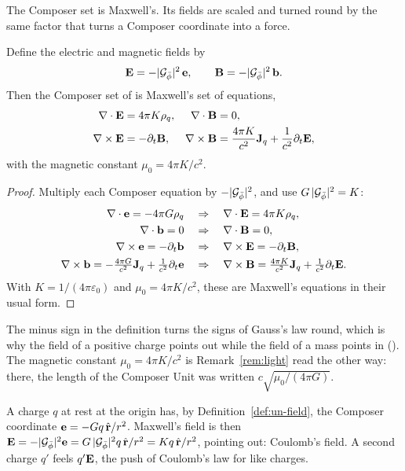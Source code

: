 The Composer set is Maxwell's. Its fields are scaled and turned round by the same factor that turns a Composer coordinate into a force.

\begin{theorem}\label{thm:un-maxwell}
Define the electric and magnetic fields by
\[
\mathbf{E} = -|\mathcal{G}_{\bar{\phi}}|^2\,\mathbf{e} , \qquad \mathbf{B} = -|\mathcal{G}_{\bar{\phi}}|^2\,\mathbf{b} .
\]
Then the Composer set of  is Maxwell's set of equations,
\begin{align*}
\nabla\cdot\mathbf{E} &= 4\pi K\rho_q , & \nabla\cdot\mathbf{B} &= 0 ,\\
\nabla\times\mathbf{E} &= -\partial_t\mathbf{B} , & \nabla\times\mathbf{B} &= \frac{4\pi K}{c^2}\mathbf{J}_q + \frac{1}{c^2}\partial_t\mathbf{E} ,
\end{align*}
with the magnetic constant $\mu_0 = 4\pi K/c^2$.
\end{theorem}

\begin{proof}
Multiply each Composer equation by $-|\mathcal{G}_{\bar{\phi}}|^2$, and use $G\,|\mathcal{G}_{\bar{\phi}}|^2 = K$:
\begin{align*}
\nabla\cdot\mathbf{e} = -4\pi G\rho_q \quad&\Rightarrow\quad \nabla\cdot\mathbf{E} = 4\pi K\rho_q ,\\
\nabla\cdot\mathbf{b} = 0 \quad&\Rightarrow\quad \nabla\cdot\mathbf{B} = 0 ,\\
\nabla\times\mathbf{e} = -\partial_t\mathbf{b} \quad&\Rightarrow\quad \nabla\times\mathbf{E} = -\partial_t\mathbf{B} ,\\
\nabla\times\mathbf{b} = -\tfrac{4\pi G}{c^2}\mathbf{J}_q + \tfrac{1}{c^2}\partial_t\mathbf{e} \quad&\Rightarrow\quad \nabla\times\mathbf{B} = \tfrac{4\pi K}{c^2}\mathbf{J}_q + \tfrac{1}{c^2}\partial_t\mathbf{E} .
\end{align*}
With $K = 1/(4\pi\varepsilon_0)$ and $\mu_0 = 4\pi K/c^2$, these are Maxwell's equations in their usual form.
\end{proof}

The minus sign in the definition turns the signs of Gauss's law round, which is why the field of a positive charge points out while the field of a mass points in (). The magnetic constant $\mu_0 = 4\pi K/c^2$ is Remark~\ref{rem:light} read the other way: there, the length of the Composer Unit was written $c\sqrt{\mu_0/(4\pi G)}$.

\begin{workedexample}
A charge $q$ at rest at the origin has, by Definition~\ref{def:un-field}, the Composer coordinate $\mathbf{e} = -Gq\,\hat{\mathbf{r}}/r^2$. Maxwell's field is then $\mathbf{E} = -|\mathcal{G}_{\bar{\phi}}|^2\mathbf{e} = G\,|\mathcal{G}_{\bar{\phi}}|^2 q\,\hat{\mathbf{r}}/r^2 = Kq\,\hat{\mathbf{r}}/r^2$, pointing out: Coulomb's field. A second charge $q'$ feels $q'\mathbf{E}$, the push of Coulomb's law for like charges.
\end{workedexample}

